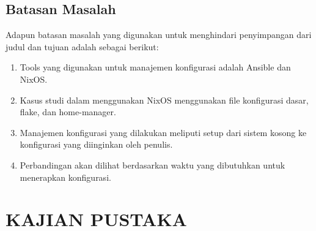 \documentclass[10pt,]{report}
\begin{document}
\section{Batasan Masalah}
\vspace{-3mm}
\begin{adjustwidth}{0.70cm}{}
	Adapun batasan masalah yang digunakan untuk menghindari penyimpangan dari judul dan tujuan adalah sebagai berikut:
	\begin{enumerate}[leftmargin=0.45cm]
		\item Tools yang digunakan untuk manajemen konfigurasi adalah Ansible dan
		      NixOS.
		\item Kasus studi dalam menggunakan NixOS menggunakan file konfigurasi
		      dasar, flake, dan home-manager.
		\item Manajemen konfigurasi yang dilakukan meliputi setup dari sistem
		      kosong ke konfigurasi yang diinginkan oleh penulis.
		\item Perbandingan akan dilihat berdasarkan waktu yang dibutuhkan untuk
		      menerapkan konfigurasi.
	\end{enumerate}
\end{adjustwidth}
\chapter{KAJIAN PUSTAKA}
\end{document}
